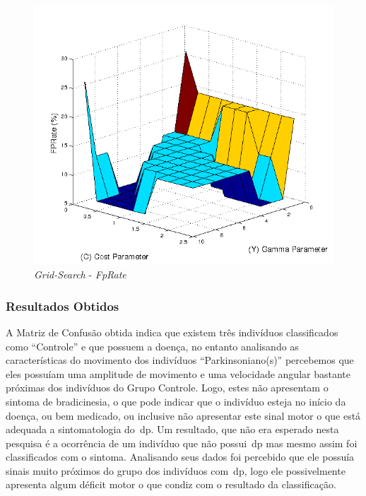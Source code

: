 \begin{figure}[!h]
 \centering
 \includegraphics[scale=0.7]{./img/gridsearchfprate.png}
\caption{\textit{Grid-Search} - \textit{FpRate}}
 \label{fig:gridfprate}
\end{figure}


\subsubsection{Resultados Obtidos}
A Matriz de Confusão obtida indica que existem três indivíduos classificados como ``Controle'' e que possuem a doença, no entanto analisando as características do movimento dos indivíduos ``Parkinsoniano(s)'' percebemos que eles possuíam uma amplitude de movimento e uma velocidade angular bastante próximas dos indivíduos do Grupo Controle. Logo, estes não apresentam o sintoma de bradicinesia, o que pode indicar que o indivíduo esteja no início da doença, ou bem medicado, ou inclusive não apresentar este sinal motor o que está adequada a sintomatologia do~\ac{dp}. 
Um resultado, que não era esperado nesta pesquisa é a ocorrência de um indivíduo que não possui~\ac{dp} mas mesmo assim foi classificados com o sintoma. Analisando seus dados foi percebido que ele possuía sinais muito próximos do grupo dos indivíduos com~\ac{dp}, logo ele possivelmente apresenta algum déficit motor o que condiz com o resultado da classificação.


